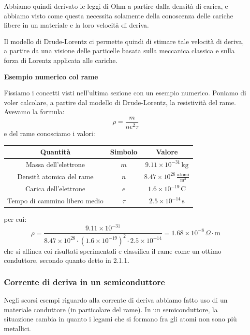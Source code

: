 \documentclass[a4paper,11pt]{article}
\begin{document}
\par\smallskip

Abbiamo quindi derivato le leggi di Ohm a partire dalla densità di carica, e abbiamo visto come questa necessita solamente della conoscenza delle cariche libere in un materiale e la loro velocità di deriva. 

Il modello di Drude-Lorentz ci permette quindi di stimare tale velocità di deriva, a partire da una visione delle particelle basata sulla meccanica classica e sulla forza di Lorentz applicata alle cariche. 

\par\smallskip

\noindent
\textbf{\textsf{Esempio numerico col rame}}

\noindent
Fissiamo i concetti visti nell'ultima sezione con un esempio numerico. Poniamo di voler calcolare, a partire dal modello di Drude-Lorentz, la resistività del rame.
Avevamo la formula:
$$
\rho = \frac{m}{n e^2 \tau}
$$
e del rame conosciamo i valori:
\begin{table}[H]
	\center {}
	\begin{tabular} { c | c | c  }
		\bfseries Quantità & \bfseries Simbolo & \bfseries Valore \\
		\hline 
		Massa dell'elettrone & $m$ & $9.11 \times 10^{-31} \, \mathrm{kg}$ \\
		Densità atomica del rame & $n$ & $8.47 \times 10^{28} \, \frac{\text{atomi}}{\mathrm{m}^3}$ \\
		Carica dell'elettrone & $e$ & $1.6 \times 10^{-19} \, \mathrm{C}$ \\ 
		Tempo di cammino libero medio & $\tau$ & $2.5 \times 10^{-14} \, \mathrm{s}$ 
	\end{tabular}
\end{table}
per cui:
$$
\rho = \frac{9.11 \times 10^{-31}}{8.47 \times 10^{28} \cdot \left( 1.6 \times 10^{-19} \right)^2 \cdot 2.5 \times 10^{-14}} = 1.68 \times 10^{-8} \, \Omega \cdot \mathrm{m}
$$
che si allinea coi risultati sperimentali e classifica il rame come un ottimo conduttore, secondo quanto detto in 2.1.1.

\subsubsection{Corrente di deriva in un semiconduttore}
Negli scorsi esempi riguardo alla corrente di deriva abbiamo fatto uso di un materiale conduttore (in particolare del rame). In un semiconduttore, la situazione cambia in quanto i legami che si formano fra gli atomi non sono più metallici.
\end{document}
